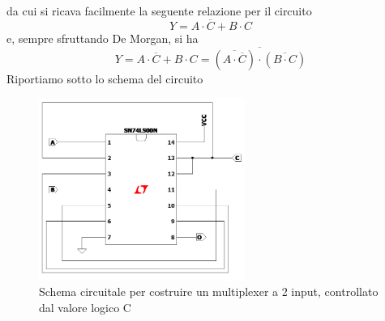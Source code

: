 \documentclass[10pt, a4paper, italian]{article}
\begin{document}
da cui si ricava facilmente la seguente relazione per il circuito
\[
Y=A\cdot\overline{C}+B\cdot C
\]
e, sempre sfruttando De Morgan, si ha
\[
Y=A\cdot\overline{C}+B\cdot C=\overline{(\overline{A\cdot\overline{C}})\cdot(\overline{B\cdot C})}
\]
Riportiamo sotto lo schema del circuito
\begin{figure}[htbp]
    \centering
    \includegraphics[width=0.6\textwidth]{NAND_MP.png}
    \caption{Schema circuitale per costruire un multiplexer a 2 input, controllato dal valore logico C}
    \label{circuito2}
\end{figure}
\end{document}
